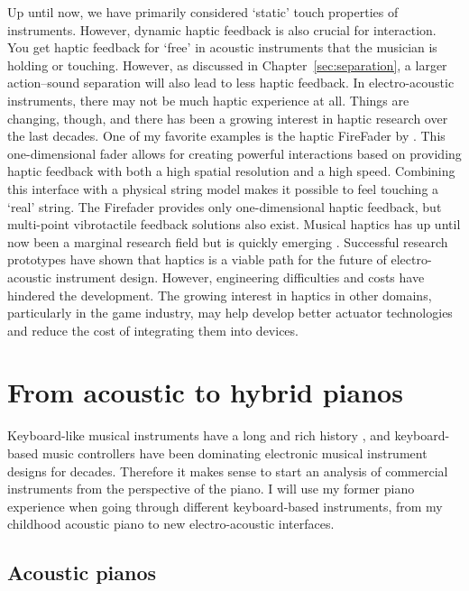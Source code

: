 Up until now, we have primarily considered `static' touch properties of instruments. However, dynamic haptic feedback is also crucial for interaction. You get haptic feedback for `free' in acoustic instruments that the musician is holding or touching. However, as discussed in Chapter~\ref{sec:separation}, a larger action--sound separation will also lead to less haptic feedback. In electro-acoustic instruments, there may not be much haptic experience at all. Things are changing, though, and there has been a growing interest in haptic research over the last decades.
One of my favorite examples is the haptic FireFader by \citet{berdahl_firefader_2013}. This one-dimensional fader allows for creating powerful interactions based on providing haptic feedback with both a high spatial resolution and a high speed. %
Combining this interface with a physical string model makes it possible to feel touching a `real' string. The Firefader provides only one-dimensional haptic feedback, but multi-point vibrotactile feedback solutions also exist. Musical haptics has up until now been a marginal research field but is quickly emerging \citep{papetti_musical_2018}. Successful research prototypes have shown that haptics is a viable path for the future of electro-acoustic instrument design. However, engineering difficulties and costs have hindered the development. The growing interest in haptics in other domains, particularly in the game industry, may help develop better actuator technologies and reduce the cost of integrating them into devices.


\section{From acoustic to hybrid pianos}

Keyboard-like musical instruments have a long and rich history \citep{keislar_history_1987}, and keyboard-based music controllers have been dominating electronic musical instrument designs for decades. Therefore it makes sense to start an analysis of commercial instruments from the perspective of the piano. I will use my former piano experience when going through different keyboard-based instruments, from my childhood acoustic piano to new electro-acoustic interfaces.


\subsection{Acoustic pianos}

